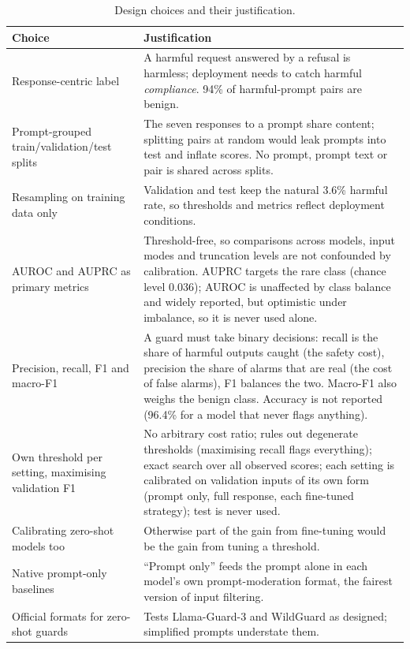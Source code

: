 \begin{table}[h]
\centering\small
\caption{Design choices and their justification.}
\label{tab:design}
\begin{tabular}{p{}p{}}
\toprule
Choice & Justification \\
\midrule
Response-centric label & A harmful request answered by a refusal is harmless; deployment needs to catch harmful \emph{compliance}. 94\% of harmful-prompt pairs are benign. \\
Prompt-grouped train/validation/test splits & The seven responses to a prompt share content; splitting pairs at random would leak prompts into test and inflate scores. No prompt, prompt text or pair is shared across splits. \\
Resampling on training data only & Validation and test keep the natural 3.6\% harmful rate, so thresholds and metrics reflect deployment conditions. \\
AUROC and AUPRC as primary metrics & Threshold-free, so comparisons across models, input modes and truncation levels are not confounded by calibration. AUPRC targets the rare class (chance level 0.036); AUROC is unaffected by class balance and widely reported, but optimistic under imbalance, so it is never used alone. \\
Precision, recall, F1 and macro-F1 & A guard must take binary decisions: recall is the share of harmful outputs caught (the safety cost), precision the share of alarms that are real (the cost of false alarms), F1 balances the two. Macro-F1 also weighs the benign class. Accuracy is not reported (96.4\% for a model that never flags anything). \\
Own threshold per setting, maximising validation F1 & No arbitrary cost ratio; rules out degenerate thresholds (maximising recall flags everything); exact search over all observed scores; each setting is calibrated on validation inputs of its own form (prompt only, full response, each fine-tuned strategy); test is never used. \\
Calibrating zero-shot models too & Otherwise part of the gain from fine-tuning would be the gain from tuning a threshold. \\
Native prompt-only baselines & ``Prompt only'' feeds the prompt alone in each model's own prompt-moderation format, the fairest version of input filtering. \\
Official formats for zero-shot guards & Tests Llama-Guard-3 and WildGuard as designed; simplified prompts understate them. \\

\end{tabular}
\end{table}
